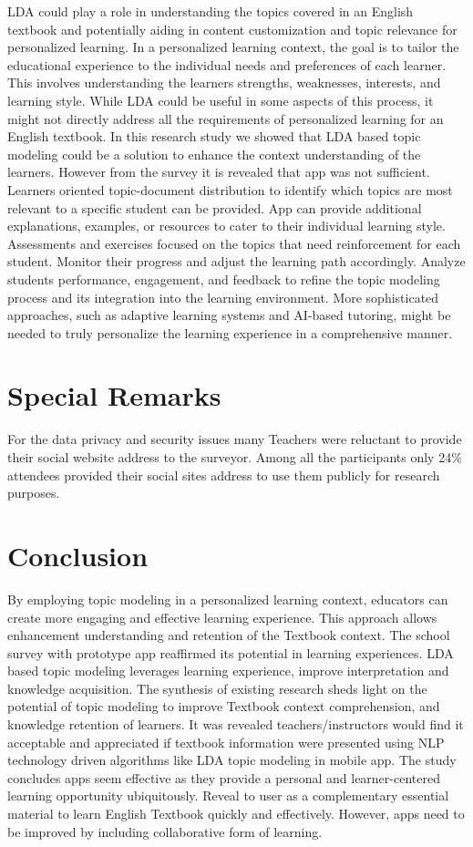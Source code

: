 \documentclass[sn-mathphys,Numbered]{sn-jnl}%
\theoremstyle{thmstyleone}%
\theoremstyle{thmstyletwo}%
\theoremstyle{thmstylethree}%
\begin{document}
LDA could play a role in understanding the topics covered in an English
textbook and potentially aiding in content customization and topic
relevance for personalized learning. In a personalized learning context,
the goal is to tailor the educational experience to the individual needs
and preferences of each learner. This involves understanding the
learner\textquotesingle s strengths, weaknesses, interests, and learning
style. While LDA could be useful in some aspects of this process, it
might not directly address all the requirements of personalized learning
for an English textbook. In this research study we showed that LDA based
topic modeling could be a solution to enhance the context understanding
of the learners. However from the survey it is revealed that app was not
sufficient. Learners oriented topic-document distribution to identify
which topics are most relevant to a specific student can be provided.
App can provide additional explanations, examples, or resources to cater
to their individual learning style. Assessments and exercises focused on
the topics that need reinforcement for each student. Monitor their
progress and adjust the learning path accordingly. Analyze
students\textquotesingle{} performance, engagement, and feedback to
refine the topic modeling process and its integration into the learning
environment. More sophisticated approaches, such as adaptive learning
systems and AI-based tutoring, might be needed to truly personalize the
learning experience in a comprehensive manner.

\section{Special Remarks}

For the data privacy and security issues many Teachers were reluctant to
provide their social website address to the surveyor. Among all the
participants only 24\% attendees provided their social sites address to
use them publicly for research purposes.

\section{Conclusion}
By employing topic modeling in a personalized learning context,
educators can create more engaging and effective learning experience.
This approach allows enhancement understanding and retention of the
Textbook context. The school survey with prototype app reaffirmed its
potential in learning experiences. LDA based topic modeling leverages
learning experience, improve interpretation and knowledge acquisition.
The synthesis of existing research sheds light on the potential of topic
modeling to improve Textbook context comprehension, and knowledge
retention of learners. It was revealed teachers/instructors would find
it acceptable and appreciated if textbook information were presented
using NLP technology driven algorithms like LDA topic modeling in mobile
app. The study concludes apps seem effective as they provide a personal
and learner-centered learning opportunity ubiquitously. Reveal to user
as a complementary essential material to learn English Textbook quickly
and effectively. However, apps need to be improved by including
collaborative form of learning.
\end{document}
